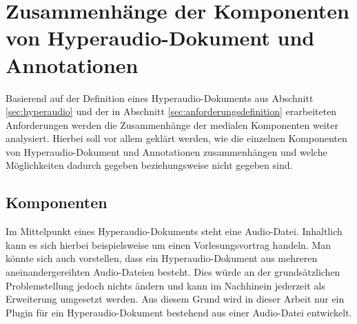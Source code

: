 %
%
%

\section{Zusammenhänge der Komponenten von Hyperaudio-Dokument und Annotationen}
Basierend auf der Definition eines Hyperaudio-Dokuments aus Abschnitt \ref{sec:hyperaudio} und der in Abschnitt \ref{sec:anforderungsdefinition} erarbeiteten Anforderungen werden die Zusammenhänge der medialen Komponenten weiter analysiert. Hierbei soll vor allem geklärt werden, wie die einzelnen Komponenten von Hyperaudio-Dokument und Annotationen zusammenhängen und welche Möglichkeiten dadurch gegeben beziehungsweise nicht gegeben sind.


\subsection{Komponenten}
Im Mittelpunkt eines Hyperaudio-Dokuments steht eine Audio-Datei. Inhaltlich kann es sich hierbei beispielsweise um einen Vorlesungsvortrag handeln. Man könnte sich auch vorstellen, dass ein Hyperaudio-Dokument aus mehreren aneinandergereihten Audio-Dateien besteht. Dies würde an der grundsätzlichen Problemstellung jedoch nichts ändern und kann im Nachhinein jederzeit als Erweiterung umgesetzt werden. Aus diesem Grund wird in dieser Arbeit nur ein Plugin für ein Hyperaudio-Dokument bestehend aus einer Audio-Datei entwickelt.

